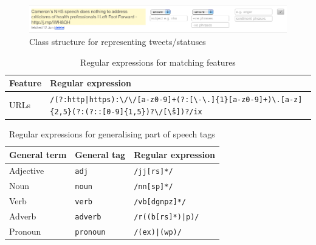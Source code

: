 \begin{figure}[h!]
	\caption{Class structure for representing tweets/statuses}
	\label{fig:status_uml}
	\centering
	\includegraphics[width=1\textwidth]{figures/labeller_label_screenshot.png}
\end{figure}

\begin{center}
\begin{longtable}{ | l | p{4in} |}
	\caption{Regular expressions for matching features} \label{table:regex} \\
	\hline
	Feature & Regular expression \\
	\hline 
	URLs & \texttt{/(?:http|https):\textbackslash/\textbackslash/[a-z0-9]+(?:[\textbackslash-\textbackslash.]\{1\}[a-z0-9]+)\*\textbackslash\-.[a-z]\{2,5\}\-(?:(?::[0-9]\{1,5\})?\textbackslash/[\^\textbackslash s]\*)?/ix} \\
	\hline
\end{longtable}
\end{center}

\begin{center}
\begin{longtable}{ | l | l | l |}
	\caption{Regular expressions for generalising part of speech tags} \label{table:regex_pos} \\
	\hline
	General term & General tag & Regular expression \\
	\hline
	Adjective & \texttt{adj} & \texttt{/jj[rs]*/} \\
 	Noun & \texttt{noun} & \texttt{/nn[sp]*/} \\
	Verb & \texttt{verb} & \texttt{/vb[dgnpz]*/} \\
	Adverb & \texttt{adverb} & \texttt{/r((b[rs]*)|p)/} \\
	Pronoun & \texttt{pronoun} & \texttt{/(ex)|(wp)/} \\
	\hline
\end{longtable}
\end{center}




